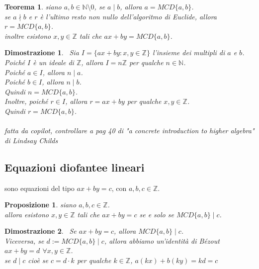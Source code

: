 \documentclass[a4paper,12pt]{article}
\theoremstyle{def}
\theoremstyle{prop}
\newtheorem*{proposition}{Proposizione}
\theoremstyle{esempio}
\theoremstyle{dimostrazione}
\newtheorem*{dimostrazione}{Dimostrazione}
\theoremstyle{teo}
\newtheorem*{teorema}{Teorema}
\theoremstyle{osservazione}
\begin{document}
\begin{teorema}
	siano \(a,b \in \mathbb{N} \setminus {0}\), se \(a \mid b\), allora \(a = MCD\{a,b\}\).\\
	se \(a \nmid b\) e \(r\) è l'ultimo resto non nullo dell'algoritmo di Euclide, allora \(r = MCD \{a,b\}\).\\
	inoltre esistono \(x,y \in \mathbb{Z} \) tali che \(ax + by = MCD \{a,b\}\).
\end{teorema}

\begin{dimostrazione}
	\
	Sia \(I = \{ax + by : x,y \in \mathbb{Z} \}\) l'insieme dei multipli di \(a\) e \(b\).\\
	Poiché \(I\) è un ideale di \(\mathbb{Z} \), allora \(I = n \mathbb{Z} \) per qualche \(n \in \mathbb{N} \).\\
	Poiché \(a \in I\), allora \(n \mid a\).\\
	Poiché \(b \in I\), allora \(n \mid b\).\\
	Quindi \(n = MCD \{a,b\}\).\\
	Inoltre, poiché \(r \in I\), allora \(r = ax + by\) per qualche \(x,y \in \mathbb{Z} \).\\
	Quindi \(r = MCD \{a,b\}\).\\
	\\
	fatta da copilot, controllare a pag 40 di "a concrete introduction to higher algebra" di Lindsay Childs
\end{dimostrazione}

\subsection{Equazioni diofantee lineari}
sono equazioni del tipo \(ax + by = c\), con \(a,b,c \in \mathbb{Z} \).\\

\begin{proposition}
	siano \(a,b,c \in \mathbb{Z} \).\\
	allora esistono \(x,y \in \mathbb{Z} \) tali che \(ax + by = c\) se e solo se \(MCD \{a,b\} \mid c\).
\end{proposition}

\begin{dimostrazione}
	\
	Se \(ax + by = c\), allora \(MCD \{a,b\} \mid c\).\\
	Viceversa, se \(d := MCD \{a,b\} \mid c\), allora abbiamo un'identità di Bézout \(ax + by = d\) \(\forall x,y \in \mathbb{Z}\).\\
	se \(d \mid c\) cioè se \(c = d \cdot k\) per qualche \(k \in \mathbb{Z} \), \(a(kx) + b(ky) = kd = c\)\\
\end{dimostrazione}
\end{document}
